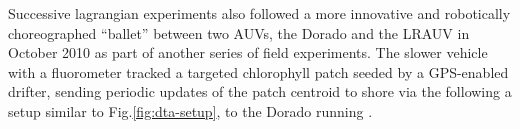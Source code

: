 Successive lagrangian experiments also followed a more innovative and
robotically choreographed ``ballet'' between two AUVs, the Dorado and
the LRAUV \cite{bellingham10} in October 2010 as part of another
series of \can field experiments. The slower vehicle with a
fluorometer tracked a targeted chlorophyll patch seeded by a
GPS-enabled drifter, sending periodic updates of the patch centroid to
shore via the \od following a setup similar to
Fig.\ref{fig:dta-setup}, to the Dorado running \rx. 

\begin{figure}
\centering 
{} 
\\

\end{figure}
